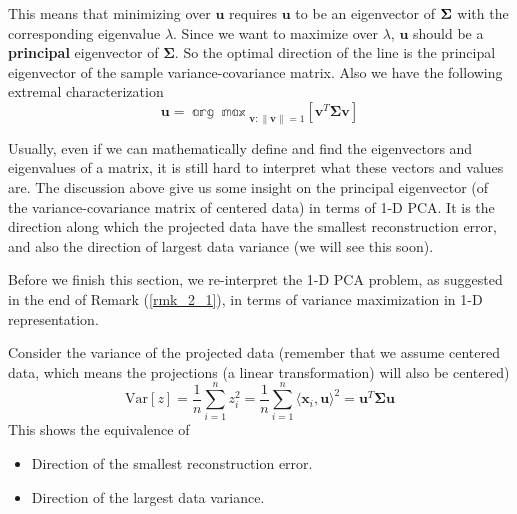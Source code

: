\documentclass[../book-template.tex]{subfiles}
\begin{document}
This means that minimizing over $\bm{u}$ requires $\bm{u}$ to be an eigenvector of ${\bf \Sigma}$ with the corresponding eigenvalue $\lambda$. Since we want to maximize over $\lambda$, $\bm{u}$ should be a \textbf{principal} eigenvector of $\bm{\Sigma}$. So the optimal direction of the line is the principal eigenvector of the sample variance-covariance matrix. Also we have the following extremal characterization
\begin{equation*}
    \bm{u} = \mathbb{\arg\max}_{\bm{v}:\|\bm{v}\|=1}\left[\bm{v}^T\bm{\Sigma v} \right]
\end{equation*}
\begin{remark}\label{rmk_2_1}
Usually, even if we can mathematically define and find the eigenvectors and eigenvalues of a matrix, it is still hard to interpret what these vectors and values are. The discussion above give us some insight on the principal eigenvector (of the variance-covariance matrix of centered data) in terms of 1-D PCA. It is the direction along which the projected data have the smallest reconstruction error, and also the direction of largest data variance (we will see this soon).
\end{remark}
\par Before we finish this section, we re-interpret the 1-D PCA problem, as suggested in the end of Remark (\ref{rmk_2_1}), in terms of variance maximization in 1-D representation. 
\par Consider the variance of the projected data (remember that we assume centered data, which means the projections (a linear transformation) will also be centered)
\begin{equation*}
    \text{Var}[z]=\frac{1}{n}\sum_{i=1}^{n}z_i^2=\frac{1}{n}\sum_{i=1}^{n}\langle \bm{x}_i,\bm{u}\rangle^2 = \bm{u}^T\bm{\Sigma u}
\end{equation*}
This shows the equivalence of
\begin{itemize}
    \item Direction of the smallest reconstruction error.
    \item Direction of the largest data variance.
\end{itemize}
\end{document}

